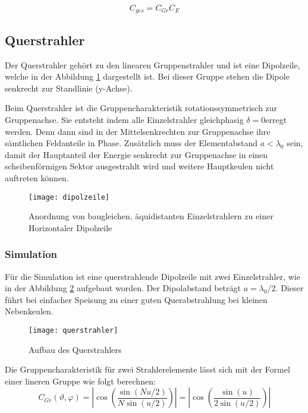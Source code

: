 \begin{equation}
C_{ges}=C_{Gr}C_{E}
\end{equation}


\subsection{Querstrahler}\label{sec:querstrahler}

Der Querstrahler gehört zu den linearen Gruppenstrahler und ist eine Dipolzeile, welche in der Abbildung \ref{fig:dipolzeile} dargestellt ist. Bei dieser Gruppe stehen die Dipole senkrecht zur Standlinie (y-Achse).

Beim Querstrahler ist die Gruppencharakteristik rotationssymmetrisch zur Gruppenachse. Sie entsteht indem alle Einzelstrahler gleichphasig $ \delta = 0 $erregt werden. Denn dann sind in der Mittelsenkrechten zur Gruppenachse ihre sämtlichen Feldanteile in Phase. Zusätzlich muss der Elementabstand $ a < \lambda_{0} $ sein, damit der Hauptanteil der Energie senkrecht zur Gruppenachse in einen scheibenförmigen Sektor ausgestrahlt wird und weitere Hauptkeulen nicht auftreten können. 

\begin{figure}[H]
	\centering
	\texttt{[image: dipolzeile]}
	\caption{Anordnung von baugleichen, äquidistanten Einzelstrahlern zu einer Horizontaler Dipolzeile }\label{fig:dipolzeile}
\end{figure}

\subsubsection{Simulation}

Für die Simulation ist eine querstrahlende Dipolzeile mit zwei Einzelstrahler, wie in der Abbildung \ref{fig:querstrahler} aufgebaut worden. Der Dipolabstand beträgt $ a = \lambda_{0}/2 $. Dieser führt bei einfacher Speisung zu einer guten Querabstrahlung bei kleinen Nebenkeulen. 

\begin{figure}[H]
	\centering
	\texttt{[image: querstrahler]}
	\caption{Aufbau des Querstrahlers}\label{fig:querstrahler}
\end{figure}

Die Gruppencharakteristik für zwei Strahlerelemente lässt sich mit der Formel einer lineren Gruppe wie folgt berechnen:
\begin{equation}
C_{Gr}(\vartheta,\varphi) = \left|  \cos \left( \dfrac{\sin(N u/2)}{N \sin(u/2)}  \right) \right| = \left|  \cos \left( \dfrac{\sin(u)}{2 \sin(u/2)}  \right) \right|
\end{equation}

